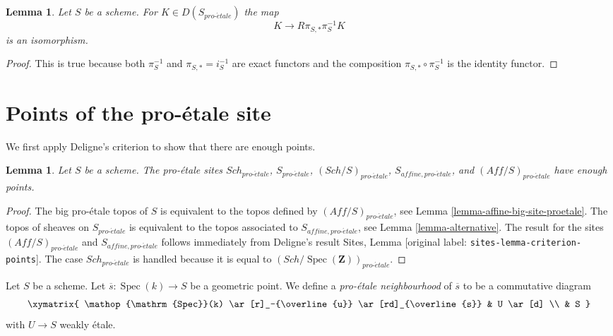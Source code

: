 \documentclass[10pt,a4paper]{article}
\theoremstyle{plain}
\newtheorem{lemma}[subsection]{Lemma}
\theoremstyle{definition}
\theoremstyle{remark}
\numberwithin{equation}{subsection}
\def\Spec{\mathop{\mathrm{Spec}}}
\def\Sch{\mathit{Sch}}
\def\proetale{{pro\text{-}\acute{e}tale}}
\begin{document}
\begin{lemma}
\label{lemma-cohomological-descent-proetale}
Let $S$ be a scheme. For $K \in D(S_\proetale)$ the map
$$
K \longrightarrow R\pi_{S, *}\pi_S^{-1}K
$$
is an isomorphism.
\end{lemma}

\begin{proof}
This is true because both $\pi_S^{-1}$ and $\pi_{S, *} = i_S^{-1}$
are exact functors and the composition $\pi_{S, *} \circ \pi_S^{-1}$
is the identity functor.
\end{proof}






















\section{Points of the pro-\'etale site}
\label{section-points}

\noindent
We first apply Deligne's criterion to show that there are enough points.

\begin{lemma}
\label{lemma-points-proetale}
Let $S$ be a scheme. The pro-\'etale sites $\Sch_\proetale$,
$S_\proetale$, $(\Sch/S)_\proetale$, $S_{affine, \proetale}$, and
$(\textit{Aff}/S)_\proetale$ have enough points.
\end{lemma}

\begin{proof}
The big pro-\'etale topos of $S$ is equivalent to the topos defined by
$(\textit{Aff}/S)_\proetale$, see
Lemma \ref{lemma-affine-big-site-proetale}.
The topos of sheaves on $S_\proetale$ is equivalent to the topos
associated to $S_{affine, \proetale}$, see
Lemma \ref{lemma-alternative}.
The result for the sites $(\textit{Aff}/S)_\proetale$ and
$S_{affine, \proetale}$ follows immediately from Deligne's result
Sites, Lemma \textnormal{[original label: \nolinkurl{sites-lemma-criterion-points}]}.
The case $\Sch_\proetale$ is handled because it is equal to
$(\Sch/\Spec(\mathbf{Z}))_\proetale$.
\end{proof}

\noindent
Let $S$ be a scheme. Let $\overline{s} : \Spec(k) \to S$ be a geometric
point. We define a {\it pro-\'etale neighbourhood} of $\overline{s}$
to be a commutative diagram
$$
\xymatrix{
\Spec(k) \ar[r]_-{\overline{u}} \ar[rd]_{\overline{s}} & U \ar[d] \\
& S
}
$$
with $U \to S$ weakly \'etale.
\end{document}
